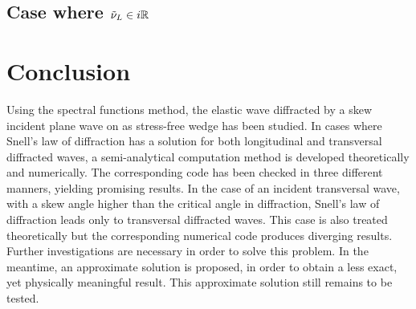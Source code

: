 \subsection{Case where $\tilde{\nu}_L \in i\mathbb{R}$}


\section*{Conclusion}
Using the spectral functions method, the elastic wave diffracted by a skew incident plane wave on as stress-free wedge has been studied. In cases where Snell's law of diffraction has a solution for both longitudinal and transversal diffracted waves, a semi-analytical computation method is developed theoretically and numerically. The corresponding code has been checked in three different manners, yielding promising results. In the case of an incident transversal wave, with a skew angle higher than the critical angle in diffraction, Snell's law of diffraction leads only to transversal diffracted waves. This case is also treated theoretically but the corresponding numerical code produces diverging results. Further investigations are necessary in order to solve this problem. In the meantime, an approximate solution is proposed, in order to obtain a less exact, yet physically meaningful result. This approximate solution still remains to be tested.
